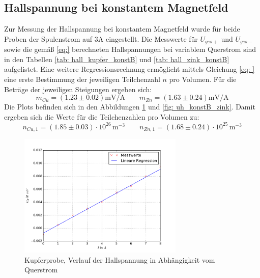 \subsection{Hallspannung bei konstantem Magnetfeld}
Zur Messung der Hallspannung bei konstantem Magnetfeld wurde für beide Proben der Spulenstrom auf $3\si{\ampere}$ eingestellt. Die
Messwerte für $U_{ges+}$ und $U_{ges-}$ sowie die gemäß \eqref{eq:} berechneten Hallspannungen bei variablem Querstrom sind in den
Tabellen \ref{tab: hall_kupfer_konstB} und \ref{tab: hall_zink_konstB} aufgelistet. Eine weitere Regressionsrechnung ermöglicht mittels Gleichung \eqref{eq: } eine
erste Bestimmung der jeweiligen Teilchenzahl $n$ pro Volumen. Für die Beträge der jeweiligen Steigungen ergeben sich:
\begin{equation}
  m_{Cu} = (1.23 \pm 0.02)\si{\milli \volt \per \ampere}  \quad \quad m_{Zn} = (1.63 \pm 0.24)\si{\milli \volt \per \ampere}%
\end{equation}
Die Plots befinden sich in den Abbildungen \ref{fig: uh_konstB_kupfer} und \ref{fig: uh_konstB_zink}.
Damit ergeben sich die Werte für die Teilchenzahlen pro Volumen zu:
\begin{equation}
  n_{Cu,1} = (1.85 \pm 0.03)\cdot 10^{26}\,\si{ \meter^{-3}} \quad \quad n_{Zn,1} = (1.68\pm 0.24)\cdot 10^{25}\,\si{ \meter^{-3}}%
\end{equation}
  \centering
  \centering
\begin{figure}
  \centering
  \includegraphics[width=0.7\textwidth]{pics/u_h_kupfer_konstB.pdf}
  \caption{Kupferprobe, Verlauf der Hallspannung in Abhängigkeit vom Querstrom}
  \label{fig: uh_konstB_kupfer}
\end{figure}
